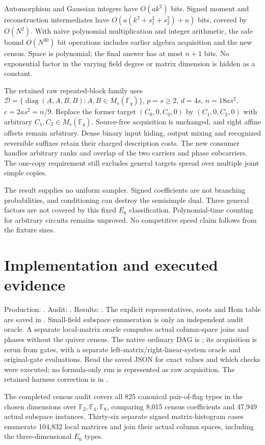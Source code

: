\documentclass[11pt]{article}
\newcommand{\F}{\mathbb F}\newcommand{\Hom}{\operatorname{Hom}}
\begin{document}
Automorphism and Gaussian integers have $O(ak^2)$ bits. Signed moment
and reconstruction intermediates have
$O(a(k^2+s_1^2+s_2^2)+n)$ bits, covered by $O(N^2)$.
With naive polynomial multiplication and integer arithmetic, the safe
bound $O(N^{30})$ bit operations includes earlier algebra acquisition
and the new census. Space is polynomial; the final answer has at most
$n+1$ bits. No exponential factor in the varying field degree or matrix
dimension is hidden as a constant.

The retained raw repeated-block family uses
$\mathcal D=\{\operatorname{diag}(A,A,B,B):A,B\in M_s(\F_q)\}$,
$p=s\ge2$, $d=4s$, $n=18as^2$, $c=2as^2=n/9$.
Replace the former target $(C_0,0,C_0,0)$ by
$(C_1,0,C_2,0)$ with arbitrary $C_1,C_2\in M_s(\F_q)$.
Source-free acquisition is unchanged, and right affine offsets remain
arbitrary. Dense binary input hiding, output mixing and recognized
reversible suffixes retain their charged description costs. The new
consumer handles arbitrary ranks and overlap of the two carriers and
phase subcarriers. The one-copy requirement still excludes general
targets spread over multiple joint simple copies.

The result supplies no uniform sampler. Signed coefficients are not
branching probabilities, and conditioning can destroy the semisimple
dual. Three general factors are not covered by this fixed $E_6$
classification. Polynomial-time counting for arbitrary circuits remains
unproved. No competitive speed claim follows from the fixture sizes.

\section{Implementation and executed evidence}
Production: . Audit:
. Results: .
The explicit representatives, roots and Hom table are saved in
. Small-field subspace enumeration is only an
independent audit oracle. A separate local-matrix oracle computes actual
column-space joins and phases without the quiver census. The native
ordinary DAG is ; its acquisition
is rerun from gates, with a separate left-matrix/right-linear-system oracle
and original-gate evaluations. Read the saved JSON for exact values and
which checks were executed; no formula-only run is represented as raw
acquisition. The retained harness correction is in
.

The completed census audit covers all 825 canonical pair-of-flag types
in the chosen dimensions over $\F_2,\F_4,\F_8$, comparing 8,015 census
coefficients and 47,949 actual subspace instances. Thirty-six separate
signed matrix-histogram cases enumerate 104,832 local matrices and join
their actual column spaces, including the three-dimensional $E_6$ types.
\end{document}
